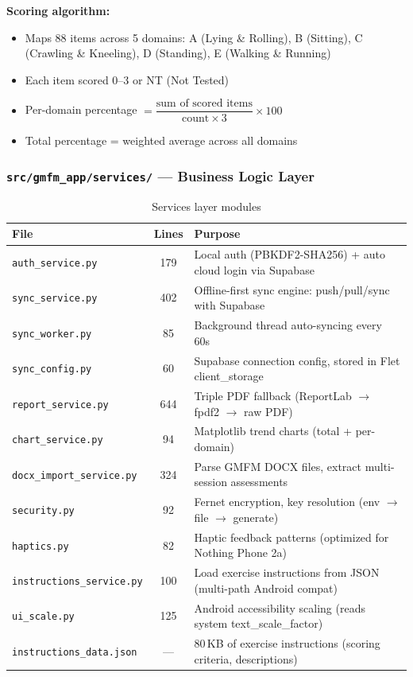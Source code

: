 \documentclass[12pt,a4paper]{article}
\begin{document}
\textbf{Scoring algorithm:}
\begin{itemize}[leftmargin=2em]
    \item Maps 88 items across 5 domains: A (Lying \& Rolling), B (Sitting), C (Crawling \& Kneeling), D (Standing), E (Walking \& Running)
    \item Each item scored 0--3 or NT (Not Tested)
    \item Per-domain percentage $= \dfrac{\text{sum of scored items}}{\text{count} \times 3} \times 100$
    \item Total percentage = weighted average across all domains
\end{itemize}

\subsubsection{\texttt{src/gmfm\_app/services/} --- Business Logic Layer}

\begin{table}[H]
\centering
\renewcommand{\arraystretch}{1.3}
\begin{tabularx}{\textwidth}{l c X}
\toprule
\textbf{File} & \textbf{Lines} & \textbf{Purpose} \\
\midrule
\texttt{auth\_service.py}        & 179 & Local auth (PBKDF2-SHA256) + auto cloud login via Supabase \\
\texttt{sync\_service.py}        & 402 & Offline-first sync engine: push/pull/sync with Supabase \\
\texttt{sync\_worker.py}         & 85  & Background thread auto-syncing every 60s \\
\texttt{sync\_config.py}         & 60  & Supabase connection config, stored in Flet client\_storage \\
\texttt{report\_service.py}      & 644 & Triple PDF fallback (ReportLab $\rightarrow$ fpdf2 $\rightarrow$ raw PDF) \\
\texttt{chart\_service.py}       & 94  & Matplotlib trend charts (total + per-domain) \\
\texttt{docx\_import\_service.py} & 324 & Parse GMFM DOCX files, extract multi-session assessments \\
\texttt{security.py}             & 92  & Fernet encryption, key resolution (env $\rightarrow$ file $\rightarrow$ generate) \\
\texttt{haptics.py}              & 82  & Haptic feedback patterns (optimized for Nothing Phone 2a) \\
\texttt{instructions\_service.py} & 100 & Load exercise instructions from JSON (multi-path Android compat) \\
\texttt{ui\_scale.py}            & 125 & Android accessibility scaling (reads system text\_scale\_factor) \\
\texttt{instructions\_data.json} & --- & 80\,KB of exercise instructions (scoring criteria, descriptions) \\
\bottomrule
\end{tabularx}
\caption{Services layer modules}
\end{table}
\end{document}
